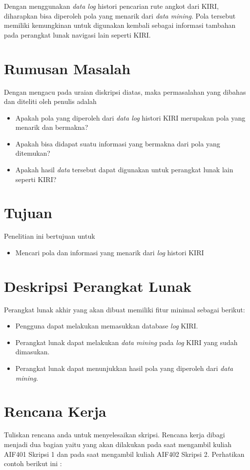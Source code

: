\documentclass[a4paper,twoside]{article}
\begin{document}
Dengan menggunakan \textsl{data log} histori pencarian rute angkot dari KIRI, diharapkan bisa diperoleh pola yang menarik dari \textsl{data mining}. Pola tersebut memiliki kemungkinan untuk digunakan kembali sebagai informasi tambahan pada perangkat lunak navigasi lain seperti KIRI.

\section{Rumusan Masalah}
Dengan mengacu pada uraian diskripsi diatas, maka permasalahan yang dibahas dan diteliti oleh penulis adalah
\begin{itemize}
	\item Apakah pola yang diperoleh dari \textsl{data log} histori KIRI merupakan pola yang menarik dan bermakna?
	\item Apakah bisa didapat suatu informasi yang bermakna dari pola yang ditemukan?
	\item Apakah hasil \textsl{data} tersebut dapat digunakan untuk perangkat lunak lain seperti KIRI?
\end{itemize}

\section{Tujuan}
Penelitian ini bertujuan untuk 
\begin{itemize}
	\item Mencari pola dan informasi yang menarik dari \textsl{log} histori KIRI
\end{itemize}

\section{Deskripsi Perangkat Lunak}
Perangkat lunak akhir yang akan dibuat memiliki fitur minimal sebagai berikut:
\begin{itemize}
	\item Pengguna dapat melakukan memasukkan database \textsl{log} KIRI.
	\item Perangkat lunak dapat melakukan \textsl{data mining} pada \textsl{log} KIRI yang sudah dimasukan.
	\item Perangkat lunak dapat menunjukkan hasil pola yang diperoleh dari \textsl{data mining}.
\end{itemize}

\section{Rencana Kerja}
Tuliskan rencana anda untuk menyelesaikan skripsi. Rencana kerja dibagi menjadi dua bagian yaitu yang akan dilakukan pada saat mengambil kuliah AIF401 Skripsi 1 dan pada saat mengambil kuliah AIF402 Skripsi 2. Perhatikan contoh berikut ini :
\end{document}
